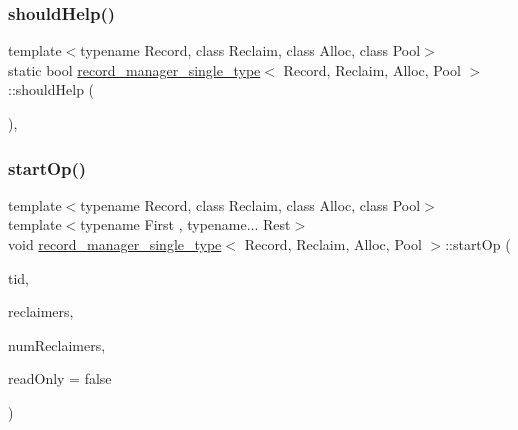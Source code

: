 \mbox{\label{classrecord__manager__single__type_aba373074564801edaa50df79b405f0e9}} 
\subsubsection{\texorpdfstring{should\+Help()}{shouldHelp()}}
{\footnotesize\ttfamily template$<$typename Record, class Reclaim, class Alloc, class Pool$>$ \\
static bool \hyperlink{classrecord__manager__single__type}{record\+\_\+manager\+\_\+single\+\_\+type}$<$ Record, Reclaim, Alloc, Pool $>$\+::should\+Help (\begin{DoxyParamCaption}{ }\end{DoxyParamCaption})\hspace{0.3cm}{\ttfamily [inline]}, {\ttfamily [static]}}

\mbox{\label{classrecord__manager__single__type_ae410965bdfc69120b290f9224d4b2053}} 
\subsubsection{\texorpdfstring{start\+Op()}{startOp()}}
{\footnotesize\ttfamily template$<$typename Record, class Reclaim, class Alloc, class Pool$>$ \\
template$<$typename First , typename... Rest$>$ \\
void \hyperlink{classrecord__manager__single__type}{record\+\_\+manager\+\_\+single\+\_\+type}$<$ Record, Reclaim, Alloc, Pool $>$\+::start\+Op (\begin{DoxyParamCaption}\item[{const int}]{tid,  }\item[{void $\ast$const $\ast$const}]{reclaimers,  }\item[{const int}]{num\+Reclaimers,  }\item[{const bool}]{read\+Only = {\ttfamily false} }\end{DoxyParamCaption})\hspace{0.3cm}{\ttfamily [inline]}}

